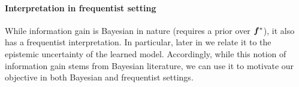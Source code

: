 \paragraph{Interpretation in frequentist setting}
While information gain is Bayesian in nature (requires a prior over ${\bm{f}}^*$), it also has a frequentist interpretation. In particular, later in  we relate it to the epistemic uncertainty of the learned model. Accordingly, while this notion of information gain stems from Bayesian literature, we can use it to motivate our objective in both Bayesian and frequentist settings.






